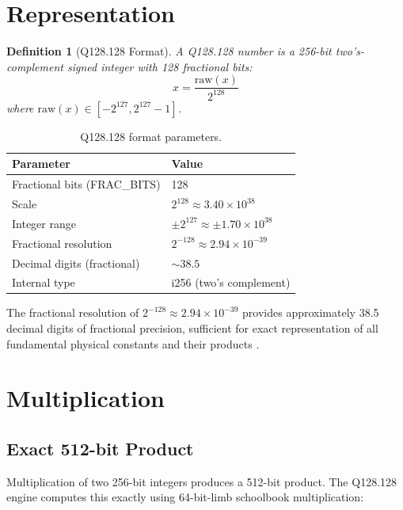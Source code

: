\documentclass[11pt]{article}
\newtheorem{definition}{Definition}
\begin{document}
\section{Representation}

\begin{definition}[Q128.128 Format]
A Q128.128 number is a 256-bit two's-complement signed integer with 128 fractional bits:
\begin{equation}
x = \frac{\text{raw}(x)}{2^{128}}
\end{equation}
where $\text{raw}(x) \in [-2^{127}, 2^{127} - 1]$.
\end{definition}

\begin{table}[ht]
\centering
\caption{Q128.128 format parameters.}
\label{tab:format}
\begin{tabular}{ll}
\toprule
Parameter & Value \\
\midrule
Fractional bits (FRAC\_BITS) & 128 \\
Scale & $2^{128} \approx 3.40 \times 10^{38}$ \\
Integer range & $\pm 2^{127} \approx \pm 1.70 \times 10^{38}$ \\
Fractional resolution & $2^{-128} \approx 2.94 \times 10^{-39}$ \\
Decimal digits (fractional) & $\sim 38.5$ \\
Internal type & i256 (two's complement) \\
\bottomrule
\end{tabular}
\end{table}

The fractional resolution of $2^{-128} \approx 2.94 \times 10^{-39}$ provides approximately 38.5 decimal digits of fractional precision, sufficient for exact representation of all fundamental physical constants and their products \cite{higham_2002}.

\section{Multiplication}

\subsection{Exact 512-bit Product}

Multiplication of two 256-bit integers produces a 512-bit product. The Q128.128 engine computes this exactly using 64-bit-limb schoolbook multiplication:
\end{document}
